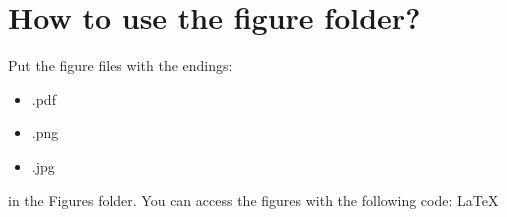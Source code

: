 \section{How to use the figure folder?}

    Put the figure files with the endings:
    \begin{itemize}
        \item .pdf
        \item .png
        \item .jpg
    \end{itemize}
    in the Figures folder. You can access the figures with the following code: \LaTeX

    